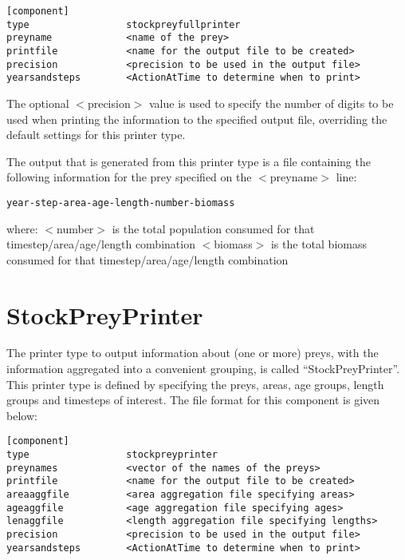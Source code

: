\documentclass[]{book}
\begin{document}
\begin{verbatim}
[component]
type                 stockpreyfullprinter
preyname             <name of the prey>
printfile            <name for the output file to be created>
precision            <precision to be used in the output file>
yearsandsteps        <ActionAtTime to determine when to print>
\end{verbatim}

The optional \(<\)precision\(>\) value is used to specify the number of
digits to be used when printing the information to the specified output
file, overriding the default settings for this printer type.

The output that is generated from this printer type is a file containing
the following information for the prey specified on the \(<\)preyname\(>\)
line:

\begin{verbatim}
year-step-area-age-length-number-biomass
\end{verbatim}

where: \(<\)number\(>\) is the total population consumed for that
timestep/area/age/length combination \(<\)biomass\(>\) is the total biomass
consumed for that timestep/area/age/length combination

\hypertarget{sec:stockpreyprinter}{%
\section{StockPreyPrinter}\label{sec:stockpreyprinter}}

The printer type to output information about (one or more) preys, with
the information aggregated into a convenient grouping, is called
``StockPreyPrinter''. This printer type is defined by specifying the
preys, areas, age groups, length groups and timesteps of interest. The
file format for this component is given below:

\begin{verbatim}
[component]
type                 stockpreyprinter
preynames            <vector of the names of the preys>
printfile            <name for the output file to be created>
areaaggfile          <area aggregation file specifying areas>
ageaggfile           <age aggregation file specifying ages>
lenaggfile           <length aggregation file specifying lengths>
precision            <precision to be used in the output file>
yearsandsteps        <ActionAtTime to determine when to print>
\end{verbatim}
\end{document}
